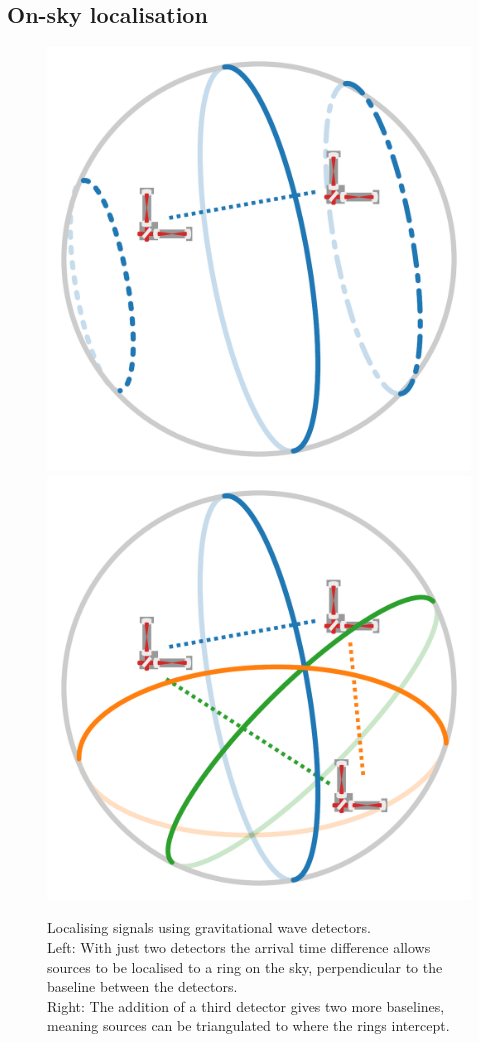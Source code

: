 \begin{colsection}
\newpage
\subsection{On-sky localisation}
\label{sec:gw_localisation}
\begin{colsection}

\begin{figure}[t]
    \begin{center}
        \includegraphics[width=0.45\linewidth]{images/triangulate_1.pdf}
        \includegraphics[width=0.45\linewidth]{images/triangulate_2.pdf}
    \end{center}
    \caption[Localising signals using gravitational wave detectors]{
        Localising signals using gravitational wave detectors. \\
        Left: With just two detectors the arrival time difference allows sources to be localised to a ring on the sky, perpendicular to the baseline between the detectors. \\
        Right: The addition of a third detector gives two more baselines, meaning sources can be triangulated to where the rings intercept.
        }\label{fig:triangulate}
\end{figure}



\todo{}


\end{colsection}
\end{colsection}
